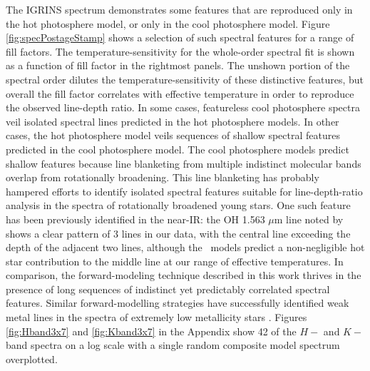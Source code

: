 \documentclass[twocolumn]{emulateapj}%
\begin{document}
The IGRINS spectrum demonstrates some features that are reproduced only in the hot photosphere model, or only in the cool photosphere model.  Figure \ref{fig:specPostageStamp} shows a selection of such spectral features for a range of fill factors.  The temperature-sensitivity for the whole-order spectral fit is shown as a function of fill factor in the rightmost panels.  The unshown portion of the spectral order dilutes the temperature-sensitivity of these distinctive features, but overall the fill factor correlates with effective temperature in order to reproduce the observed line-depth ratio.  In some cases, featureless cool photosphere spectra veil isolated spectral lines predicted in the hot photosphere models.  In other cases, the hot photosphere model veils sequences of shallow spectral features predicted in the cool photosphere model.  The cool photosphere models predict shallow features because line blanketing from multiple indistinct molecular bands overlap from rotationally broadening.  This line blanketing has probably hampered efforts to identify isolated spectral features suitable for line-depth-ratio analysis in the spectra of rotationally broadened young stars.  One such feature has been previously identified in the near-IR: the OH 1.563 $\mu$m line noted by \citet{oneal01} shows a clear pattern of 3 lines in our data, with the central line exceeding the depth of the adjacent two lines, although the \PHOENIX\ models predict a non-negligible hot star contribution to the middle line at our range of effective temperatures.  In comparison, the forward-modeling technique described in this work thrives in the presence of long sequences of indistinct yet predictably correlated spectral features.  Similar forward-modelling strategies have successfully identified weak metal lines in the spectra of extremely low metallicity stars .  Figures \ref{fig:Hband3x7} and \ref{fig:Kband3x7} in the Appendix show 42 of the $H-$ and $K-$band spectra on a log scale with a single random composite model spectrum overplotted.  
\end{document}
